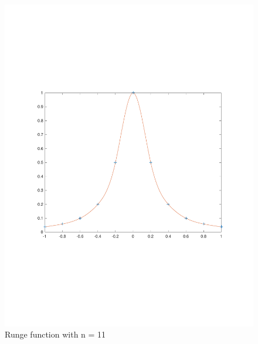 \documentclass{article}
\begin{document}
\begin{figure}[h]
\centering
\caption{Runge function with n = 11}
\includegraphics[scale=0.6]{runge_n=11}
\end{figure}
\end{document}
